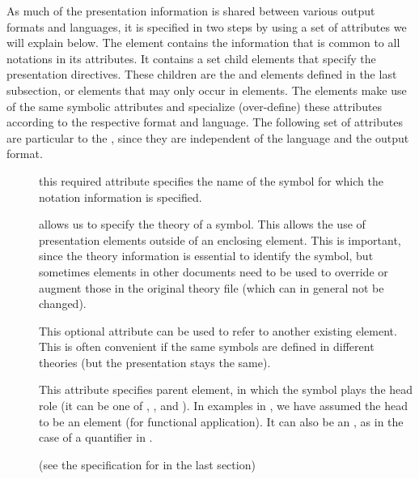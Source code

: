 As much of the presentation information is shared between various output formats
and languages, it is specified in two steps by using a set of attributes we will
explain below.  The {} element contains the information that
is common to all notations in its attributes. It contains a set child elements
that specify the presentation directives. These children are the {}
and {} elements defined in the last subsection, or {}
elements that may only occur in {} elements. The
{} elements make use of the same symbolic attributes and specialize
(over-define) these attributes according to the respective format and language.
The following set of attributes are particular to the {},
since they are independent of the language and the output format.
\begin{description}
\item[{}] this required attribute specifies the name
  of the symbol for which the notation information is specified.
\item[{}] allows us to specify the theory of a
  symbol. This allows the use of presentation elements outside of an enclosing
  {} element. This is important, since the theory information is
  essential to identify the symbol, but sometimes {}
  elements in other documents need to be used to override or augment those in the
  original theory file (which can in general not be changed).
\item[{}] This optional attribute can be used to
  refer to another existing {} element. This is often
  convenient if the same symbols are defined in different theories (but the
  presentation stays the same).
\item[{}] This attribute specifies parent
  element, in which the symbol plays the head role (it can be one of
  {}, {},
  and {}). In examples in
  {}, we have assumed the head to be an {}
  element (for functional application). It can also be an {}, as
  in the case of a quantifier in {}.
\item[{}] (see the specification for
  {} in the last section)

\end{description}
